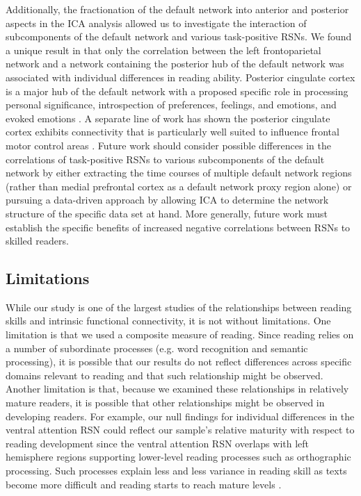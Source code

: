 Additionally, the fractionation of the default network into anterior and posterior aspects in the ICA analysis allowed us to investigate the interaction of subcomponents of the default network and various task-positive RSNs. We found a unique result in that only the correlation between the left frontoparietal network and a network containing the posterior hub of the default network was associated with individual differences in reading ability. Posterior cingulate cortex is a major hub of the default network \citep{Leech2012} with a proposed specific role in processing personal significance, introspection of preferences, feelings, and emotions, and evoked emotions \citep{Andrews-Hanna2010}. A separate line of work has shown the posterior cingulate cortex exhibits connectivity that is particularly well suited to influence frontal motor control areas \citep{Uddin2009}. Future work should consider possible differences in the correlations of task-positive RSNs to various subcomponents of the default network by either extracting the time courses of multiple default network regions (rather than medial prefrontal cortex as a default network proxy region alone) or pursuing a data-driven approach by allowing ICA to determine the network structure of the specific data set at hand. More generally, future work must establish the specific benefits of increased negative correlations between RSNs to skilled readers.

\subsection{Limitations}

While our study is one of the largest studies of the relationships between reading skills and intrinsic functional connectivity, it is not without limitations. One limitation is that we used a composite measure of reading. Since reading relies on a number of subordinate processes (e.g. word recognition and semantic processing), it is possible that our results do not reflect differences across specific domains relevant to reading and that such relationship might be observed. Another limitation is that, because we examined these relationships in relatively mature readers, it is possible that other relationships might be observed in developing readers. For example, our null findings for individual differences in the ventral attention RSN could reflect our sample’s relative maturity with respect to reading development since the ventral attention RSN overlaps with left hemisphere regions supporting lower-level reading processes such as orthographic processing. Such processes explain less and less variance in reading skill as texts become more difficult and reading starts to reach mature levels \citep{Cutting2006}. 

